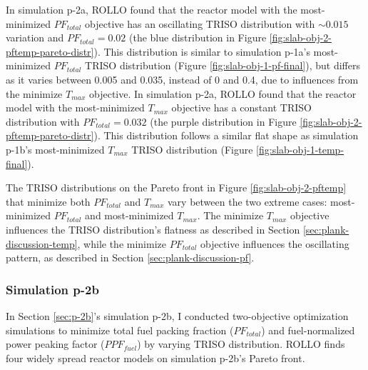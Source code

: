 In simulation p-2a, \gls{ROLLO} found that the reactor model with the 
most-minimized $PF_{total}$ objective has an oscillating TRISO distribution with 
$\sim0.015$ variation and $PF_{total}=0.02$
(the blue distribution in Figure \ref{fig:slab-obj-2-pftemp-pareto-distr}). 
This distribution is similar to simulation p-1a's most-minimized $PF_{total}$ TRISO 
distribution (Figure \ref{fig:slab-obj-1-pf-final}), but differs as it varies between 
0.005 and 0.035, instead of 0 and 0.4, due to influences from the minimize $T_{max}$ 
objective. 
In simulation p-2a, \gls{ROLLO} found that the reactor model with the most-minimized 
$T_{max}$ objective has a constant TRISO distribution with $PF_{total} = 0.032$
(the purple distribution in Figure \ref{fig:slab-obj-2-pftemp-pareto-distr}).
This distribution follows a similar flat shape as simulation p-1b's most-minimized 
$T_{max}$ TRISO distribution (Figure \ref{fig:slab-obj-1-temp-final}).

The \gls{TRISO} distributions on the Pareto front in Figure \ref{fig:slab-obj-2-pftemp} 
that minimize both $PF_{total}$ and $T_{max}$ vary between the two extreme cases: 
most-minimized $PF_{total}$ and most-minimized $T_{max}$. 
The minimize $T_{max}$ objective influences the TRISO distribution's flatness as 
described in Section \ref{sec:plank-discussion-temp}, while 
the minimize $PF_{total}$ objective influences the oscillating pattern, as described 
in Section \ref{sec:plank-discussion-pf}.

\subsubsection{Simulation p-2b}
In Section \ref{sec:p-2b}'s simulation p-2b, I conducted two-objective 
optimization simulations to minimize total fuel packing fraction ($PF_{total}$) and 
fuel-normalized power peaking factor ($PPF_{fuel}$) by varying TRISO distribution. 
\gls{ROLLO} finds four widely spread reactor models on simulation p-2b's Pareto 
front. 

